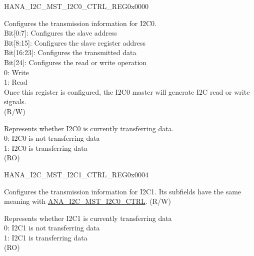 \begin{register}{H}{ANA\_I2C\_MST\_I2C0\_CTRL\_REG}{0x0000}\label{regdesc:ANAI2CMSTI2C0CTRLREG}
%
%
%
\regnewline%
\begin{regdesc}\begin{reglist}
\label{fielddesc:ANAI2CMSTI2C0CTRL}\item [ANA\_I2C\_MST\_I2C0\_CTRL] 
Configures the transmission information for I2C0. \\
Bit[0:7]: Configures the slave address\\
Bit[8:15]: Configures the slave register address\\
Bit[16:23]: Configures the transmitted data\\
Bit[24]: Configures the read or write operation\\
0: Write \\
1: Read \\
Once this register is configured, the I2C0 master will generate I2C read or write signals.\\
(R/W)
\label{fielddesc:ANAI2CMSTI2C0BUSY}\item [ANA\_I2C\_MST\_I2C0\_BUSY] Represents whether I2C0 is currently transferring data. \\
0: I2C0 is not transferring data\\
1: I2C0 is transferring data \\
(RO)
\end{reglist}\end{regdesc}
\end{register}


\begin{register}{H}{ANA\_I2C\_MST\_I2C1\_CTRL\_REG}{0x0004}\label{regdesc:ANAI2CMSTI2C1CTRLREG}
%
%
%
\regnewline%
\begin{regdesc}\begin{reglist}
\label{fielddesc:ANAI2CMSTI2C1CTRL}\item [ANA\_I2C\_MST\_I2C1\_CTRL] Configures the transmission information for I2C1. Its subfields have the same meaning with \hyperref[fielddesc:ANAI2CMSTI2C0CTRL]{ANA\_I2C\_MST\_I2C0\_CTRL}. (R/W)
\label{fielddesc:ANAI2CMSTI2C1BUSY}\item [ANA\_I2C\_MST\_I2C1\_BUSY] Represents whether I2C1 is currently transferring data \\
0: I2C1 is not transferring data\\
1: I2C1 is transferring data \\
(RO)
\end{reglist}\end{regdesc}
\end{register}


